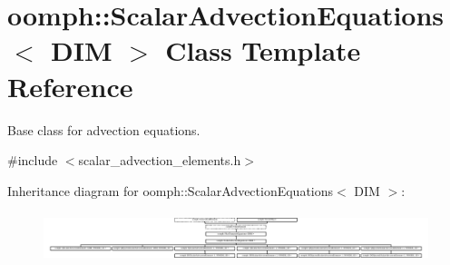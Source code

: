 \hypertarget{classoomph_1_1ScalarAdvectionEquations}{}\section{oomph\+:\+:Scalar\+Advection\+Equations$<$ D\+IM $>$ Class Template Reference}
\label{classoomph_1_1ScalarAdvectionEquations}


Base class for advection equations.  




{\ttfamily \#include $<$scalar\+\_\+advection\+\_\+elements.\+h$>$}

Inheritance diagram for oomph\+:\+:Scalar\+Advection\+Equations$<$ D\+IM $>$\+:\begin{figure}[H]
\begin{center}
\leavevmode
\includegraphics[height=1.465969cm]{classoomph_1_1ScalarAdvectionEquations}
\end{center}
\end{figure}
